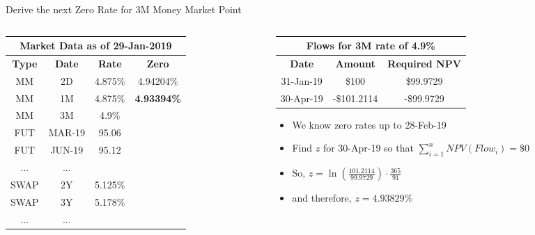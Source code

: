 \documentclass[handout, aspectratio=169]{beamer}
\begin{document}
\begin{frame}{Derive the next Zero Rate for 3M Money Market Point}
	\begin{columns}[T]
		\begin{column}{0.4\textwidth}
			\begin{table}[t]
				\centering
				\begin{adjustbox}{max width=\textwidth, max height=\textheight}
					\begin{tabular}{|c|c|c|c|} 
						\hline
						\multicolumn{4}{|c|}{\textbf{Market Data as of 29-Jan-2019}} \\
						\hline
						\textbf{Type} & \textbf{Date}  & \textbf{Rate} & \textbf{Zero}\\				
						\hline
						MM & 2D & 4.875\% & 4.94204\% \\
						MM & 1M & 4.875\% & \textbf{4.93394\%} \\
						MM & 3M & 4.9\% &\\
						\hline
						FUT & MAR-19 & 95.06 &\\
						FUT & JUN-19 & 95.12 &\\
						... & ... & &\\
						\hline
						SWAP & 2Y & 5.125\% &\\
						SWAP & 3Y & 5.178\% &\\
						... & ... & &\\
						\hline
					\end{tabular}
				\end{adjustbox}
			\end{table}
		\end{column}
		
		\begin{column}{0.7\textwidth}
			\begin{table}[t]
				\centering
				\begin{adjustbox}{max width=0.6\textwidth}
					\begin{tabular}{|c|c|c|} 
						\hline
						\multicolumn{3}{|c|}{\textbf{Flows for 3M rate of 4.9\%}} \\
						\hline
						\textbf{Date} & \textbf{Amount}  & \textbf{Required NPV}\\				
						\hline
						31-Jan-19 & \$100 & \$99.9729 \\
						\hline
						30-Apr-19 & -\$101.2114 & -\$99.9729 \\
						\hline
					\end{tabular}
				\end{adjustbox}
			\end{table}
			\begin{itemize}
				\item We know zero rates up to 28-Feb-19
				\item Find $z$ for 30-Apr-19 so that $\sum_{i=1}^{n} NPV(Flow_i) = \$0$
				\item So, $z = \ln(\frac{101.2114}{99.9729}) \cdot \frac{365}{91}$
				\item and therefore, $z = 4.93829\%$
			\end{itemize}
		 \end{column}
	\end{columns}
\end{frame}
\end{document}
